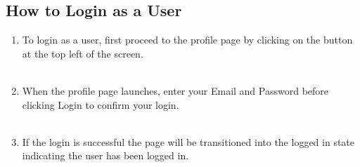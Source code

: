 \documentclass[12pt,a4paper]{article}
\begin{document}
			\subsection{How to Login as a User}
				\begin{enumerate}
					\item To login as a user, first proceed to the profile page by clicking on the button at 
						the top left of the screen.\\\\
					\item When the profile page launches, enter your Email and Password before clicking Login 
						to confirm your login.\\\\
						\newpage
					\item If the login is successful the page will be transitioned into the logged in state 
						indicating the user has been logged in.\\\\
				\end{enumerate}
			
\end{document}

